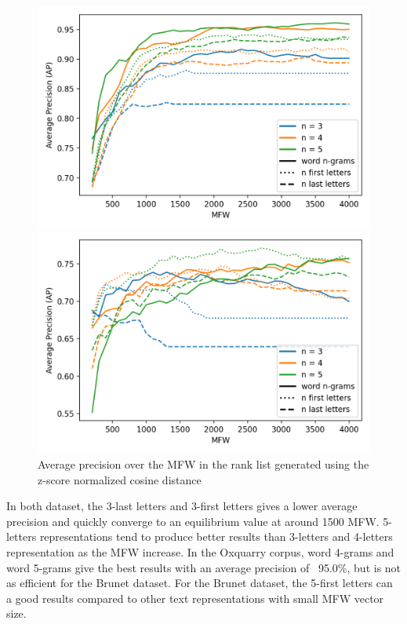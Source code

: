 \begin{figure}
  \centering
  \caption{Average precision over the MFW in the rank list generated using the z-score normalized cosine distance}

  \label{fig:first_last_letters_ngrams_oxquarry}
  \includegraphics[width=\linewidth]{img/first_last_letters_ngrams_oxquarry.png}

  \label{fig:first_last_letters_ngrams_brunet}
  \includegraphics[width=\linewidth]{img/first_last_letters_ngrams_brunet.png}
\end{figure}

In both dataset, the 3-last letters and 3-first letters gives a lower average precision and quickly converge to an equilibrium value at around 1500 MFW.
5-letters representations tend to produce better results than 3-letters and 4-letters representation as the MFW increase.
In the Oxquarry corpus, word 4-grams and word 5-grams give the best results with an average precision of ~95.0\%, but is not as efficient for the Brunet dataset.
For the Brunet dataset, the 5-first letters can a good results compared to other text representations with small MFW vector size.

